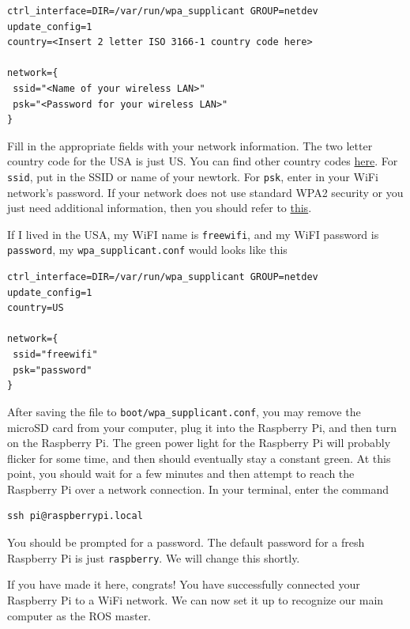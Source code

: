 \documentclass[11pt]{article}
\begin{document}
\begin{verbatim}
ctrl_interface=DIR=/var/run/wpa_supplicant GROUP=netdev
update_config=1
country=<Insert 2 letter ISO 3166-1 country code here>

network={
 ssid="<Name of your wireless LAN>"
 psk="<Password for your wireless LAN>"
}
\end{verbatim}

Fill in the appropriate fields with your network information. The two letter country code for the USA is just US. You can find other country codes \href{https://en.wikipedia.org/wiki/ISO_3166-1}{here}. For \verb|ssid|, put in the SSID or name of your newtork. For \verb|psk|, enter in your WiFi network's password. If your network does not use standard WPA2 security or you just need additional information, then you should refer to \href{https://www.raspberrypi.org/documentation/configuration/wireless/wireless-cli.md}{this}.
\newline
\vspace{2mm}

If I lived in the USA, my WiFI name is \verb|freewifi|, and my WiFI password is \verb|password|, my \verb|wpa_supplicant.conf| would looks like this
\begin{verbatim}
ctrl_interface=DIR=/var/run/wpa_supplicant GROUP=netdev
update_config=1
country=US

network={
 ssid="freewifi"
 psk="password"
}
\end{verbatim}
After saving the file to \verb|boot/wpa_supplicant.conf|, you may remove the microSD card from your computer, plug it into the Raspberry Pi, and then turn on the Raspberry Pi. The green power light for the Raspberry Pi will probably flicker for some time, and then should eventually stay a constant green. At this point, you should wait for a few minutes and then attempt to reach the Raspberry Pi over a network connection. In your terminal, enter the command

\begin{verbatim}
ssh pi@raspberrypi.local
\end{verbatim}

You should be prompted for a password. The default password for a fresh Raspberry Pi is just \verb|raspberry|. We will change this shortly.
\newline
\vspace{2mm}

If you have made it here, congrats! You have successfully connected your Raspberry Pi to a WiFi network. We can now set it up to recognize our main computer as the ROS master.
\end{document}
